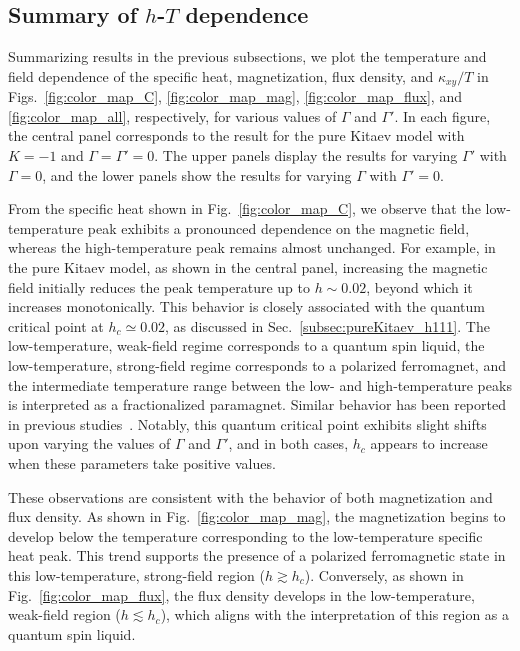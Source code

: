\documentclass[twocolumn,superscriptaddress,showpacs, longbibliography, aps, prx]{revtex4-2}
\begin{document}
\subsection{Summary of $h$-$T$ dependence}
\label{sec:summary_of_temp_field}
Summarizing results in the previous subsections, we plot the temperature and field dependence of the specific heat, magnetization, flux density, and $\kappa_{xy}/T$ in Figs.~\ref{fig:color_map_C}, \ref{fig:color_map_mag}, \ref{fig:color_map_flux}, and \ref{fig:color_map_all}, respectively, for various values of $\Gamma$ and $\Gamma'$. 
In each figure, the central panel corresponds to the result for the pure Kitaev model with $K=-1$ and $\Gamma=\Gamma'=0$. 
The upper panels display the results for varying $\Gamma'$ with $\Gamma=0$, and the lower panels show the results for varying $\Gamma$ with $\Gamma'=0$. 

From the specific heat shown in Fig.~\ref{fig:color_map_C}, we observe that the low-temperature peak exhibits a pronounced dependence on the magnetic field, whereas the high-temperature peak remains almost unchanged. For example, in the pure Kitaev model, as shown in the central panel, increasing the magnetic field initially reduces the peak temperature up to $h \sim 0.02$, beyond which it increases monotonically. This behavior is closely associated with the quantum critical point at $h_c \simeq 0.02$, as discussed in Sec.~\ref{subsec:pureKitaev_h111}. 
The low-temperature, weak-field regime corresponds to a quantum spin liquid, the low-temperature, strong-field regime corresponds to a polarized ferromagnet, and the intermediate temperature range between the low- and high-temperature peaks is interpreted as a fractionalized paramagnet. Similar behavior has been reported in previous studies~\cite{YoshitakeNKM2020,Li2020,LiLXGQLS2024}.
Notably, this quantum critical point exhibits slight shifts upon varying the values of $\Gamma$ and $\Gamma'$, and in both cases, $h_c$ appears to increase when these parameters take positive values. 

These observations are consistent with the behavior of both magnetization and flux density. 
As shown in Fig.~\ref{fig:color_map_mag}, the magnetization begins to develop below the temperature corresponding to the low-temperature specific heat peak. 
This trend supports the presence of a polarized ferromagnetic state in this low-temperature, strong-field region ($h \gtrsim h_c$). 
Conversely, as shown in Fig.~\ref{fig:color_map_flux}, the flux density develops in the low-temperature, 
weak-field region ($h \lesssim h_c$), which aligns with the interpretation of this region as a quantum spin liquid.
\end{document}
